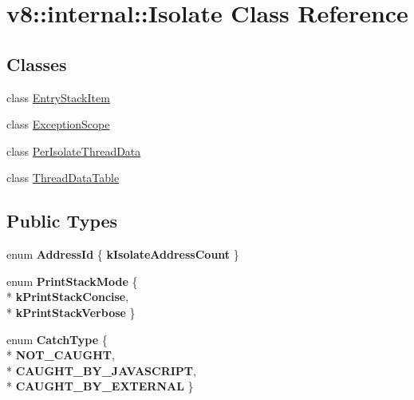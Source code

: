 \hypertarget{classv8_1_1internal_1_1_isolate}{}\section{v8\+:\+:internal\+:\+:Isolate Class Reference}
\label{classv8_1_1internal_1_1_isolate}
\subsection*{Classes}
\begin{DoxyCompactItemize}
\item 
class \hyperlink{classv8_1_1internal_1_1_isolate_1_1_entry_stack_item}{Entry\+Stack\+Item}
\item 
class \hyperlink{classv8_1_1internal_1_1_isolate_1_1_exception_scope}{Exception\+Scope}
\item 
class \hyperlink{classv8_1_1internal_1_1_isolate_1_1_per_isolate_thread_data}{Per\+Isolate\+Thread\+Data}
\item 
class \hyperlink{classv8_1_1internal_1_1_isolate_1_1_thread_data_table}{Thread\+Data\+Table}
\end{DoxyCompactItemize}
\subsection*{Public Types}
\begin{DoxyCompactItemize}
\item 
enum {\bfseries Address\+Id} \{ {\bfseries k\+Isolate\+Address\+Count}
 \}\hypertarget{classv8_1_1internal_1_1_isolate_a6ed9b2687bf08479f019e2cbb75503b2}{}\label{classv8_1_1internal_1_1_isolate_a6ed9b2687bf08479f019e2cbb75503b2}

\item 
enum {\bfseries Print\+Stack\+Mode} \{ \\*
{\bfseries k\+Print\+Stack\+Concise}, 
\\*
{\bfseries k\+Print\+Stack\+Verbose}
 \}\hypertarget{classv8_1_1internal_1_1_isolate_aef5bee5d81ec520bf39817d71191546f}{}\label{classv8_1_1internal_1_1_isolate_aef5bee5d81ec520bf39817d71191546f}

\item 
enum {\bfseries Catch\+Type} \{ \\*
{\bfseries N\+O\+T\+\_\+\+C\+A\+U\+G\+HT}, 
\\*
{\bfseries C\+A\+U\+G\+H\+T\+\_\+\+B\+Y\+\_\+\+J\+A\+V\+A\+S\+C\+R\+I\+PT}, 
\\*
{\bfseries C\+A\+U\+G\+H\+T\+\_\+\+B\+Y\+\_\+\+E\+X\+T\+E\+R\+N\+AL}
 \}\hypertarget{classv8_1_1internal_1_1_isolate_a3c9d332f88db6d6acd25098f51700e23}{}\label{classv8_1_1internal_1_1_isolate_a3c9d332f88db6d6acd25098f51700e23}

\end{DoxyCompactItemize}
